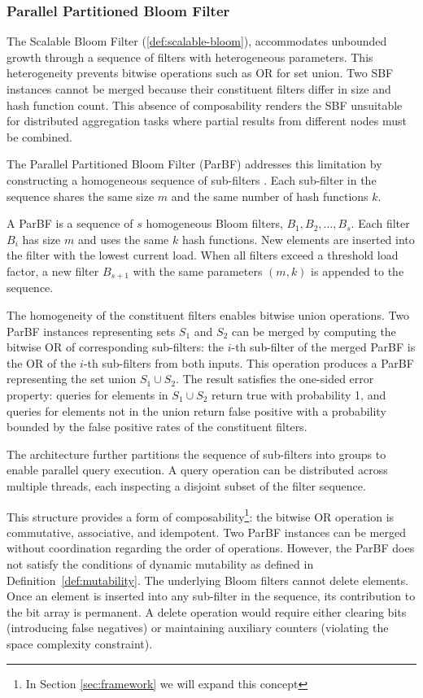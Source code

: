 \subsubsection{Parallel Partitioned Bloom Filter}

The Scalable Bloom Filter (\ref{def:scalable-bloom}), accommodates unbounded growth through a sequence of filters with heterogeneous parameters. This heterogeneity prevents bitwise operations such as OR for set union. Two SBF instances cannot be merged because their constituent filters differ in size and hash function count. This absence of composability renders the SBF unsuitable for distributed aggregation tasks where partial results from different nodes must be combined.

The Parallel Partitioned Bloom Filter (ParBF) addresses this limitation by constructing a homogeneous sequence of sub-filters \cite{Liu2014ParBFAP}. Each sub-filter in the sequence shares the same size $m$ and the same number of hash functions $k$.

\begin{definition}
    A ParBF is a sequence of $s$ homogeneous Bloom filters, $B_1, B_2, \ldots, B_s$. Each filter $B_i$ has size $m$ and uses the same $k$ hash functions. New elements are inserted into the filter with the lowest current load. When all filters exceed a threshold load factor, a new filter $B_{s+1}$ with the same parameters $(m, k)$ is appended to the sequence.
\end{definition}

The homogeneity of the constituent filters enables bitwise union operations. Two ParBF instances representing sets $S_1$ and $S_2$ can be merged by computing the bitwise OR of corresponding sub-filters: the $i$-th sub-filter of the merged ParBF is the OR of the $i$-th sub-filters from both inputs. This operation produces a ParBF representing the set union $S_1 \cup S_2$. The result satisfies the one-sided error property: queries for elements in $S_1 \cup S_2$ return true with probability 1, and queries for elements not in the union return false positive with a probability bounded by the false positive rates of the constituent filters.

The architecture further partitions the sequence of sub-filters into groups to enable parallel query execution. A query operation can be distributed across multiple threads, each inspecting a disjoint subset of the filter sequence.

This structure provides a form of composability\footnote{In Section \ref{sec:framework} we will expand this concept}: the bitwise OR operation is commutative, associative, and idempotent. Two ParBF instances can be merged without coordination regarding the order of operations. However, the ParBF does not satisfy the conditions of dynamic mutability as defined in Definition~\ref{def:mutability}. The underlying Bloom filters cannot delete elements. Once an element is inserted into any sub-filter in the sequence, its contribution to the bit array is permanent. A delete operation would require either clearing bits (introducing false negatives) or maintaining auxiliary counters (violating the space complexity constraint).

